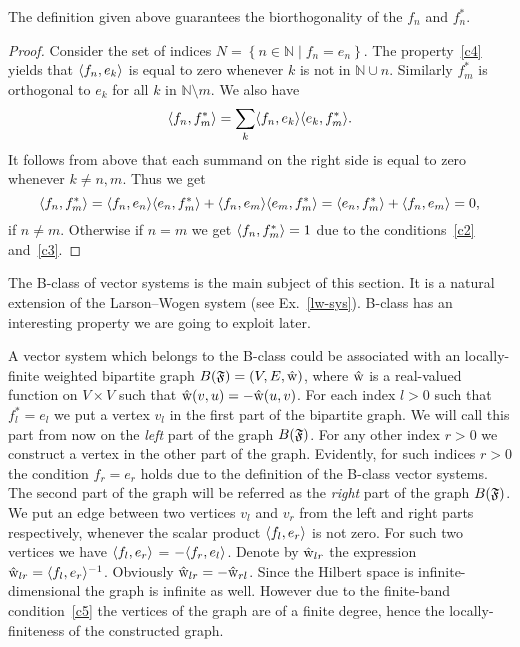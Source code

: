 \documentclass[12pt]{amsart}
\begin{document}
    \begin{prop}
      The definition given above guarantees the biorthogonality of the $f_n$ and $f^*_n$.
    \end{prop}
    \begin{proof}
      Consider the set of indices $N = \left\{n \in \mathbb{N} \mid f_n = e_n \right\}$.
      The property~\ref{c4} yields that $\langle f_n, e_k \rangle$ is equal to zero whenever $k$ is not in
        $\mathbb{N} \cup {n}$.
      Similarly $f^*_m$ is orthogonal to $e_k$ for all $k$ in $\mathbb{N} \setminus {m}$.
      We also have
      \[
        \langle f_n, f^*_m \rangle = \sum_{k} \langle f_n, e_k \rangle \langle e_k, f^*_m \rangle.
      \]
      It follows from above that each summand on the right side is equal to zero whenever $k \neq n, m$.
      Thus we get
      \[
        \langle f_n, f^*_m \rangle = \langle f_n, e_n \rangle \langle e_n, f^*_m \rangle + \langle f_n, e_m \rangle \langle e_m, f^*_m \rangle
        = \langle e_n, f^*_m \rangle + \langle f_n, e_m \rangle = 0,
      \]
      if $n \neq m$.
      Otherwise if $n = m$ we get $\langle f_n, f^*_m \rangle = 1$ due to the conditions~\ref{c2} and~\ref{c3}.
    \end{proof}
    The B-class of vector systems is the main subject of this section.
    It is a natural extension of the Larson--Wogen system (see Ex.~\ref{lw-sys}).
    B-class has an interesting property we are going to exploit later.
    \begin{remark}
      A vector system which belongs to the B-class could be associated with an
        locally-finite weighted bipartite graph $B(\mathfrak{F}) = (V, E, \mathrm{\hat{w}})$, where $\mathrm{\hat{w}}$ is a
        real-valued function on $V\times V$ such that $\mathrm{\hat{w}}(v, u) = -\mathrm{\hat{w}}(u, v)$.
      For each index $l > 0$ such that $f^*_l = e_l$ we put a vertex $v_l$ in the first part of the bipartite graph.
      We will call this part from now on the \emph{left} part of the graph $B(\mathfrak{F})$.
      For any other index $r > 0$ we construct a vertex in the other part of the graph.
      Evidently, for such indices $r > 0$ the condition $f_r = e_r$ holds due to the definition of the B-class vector systems.
      The second part of the graph will be referred as the \emph{right} part of the graph $B(\mathfrak{F})$.
      We put an edge between two vertices $v_l$ and $v_r$ from the left and right parts respectively,
        whenever the scalar product $\langle f_l, e_r \rangle$ is not zero.
      For such two vertices we have $\langle f_l, e_r \rangle$ = $-\langle f_r, e_l \rangle$.
      Denote by $\mathrm{\hat{w}}_{lr}$ the expression $\mathrm{\hat{w}}_{lr} = \langle f_l, e_r \rangle^{-1}$.
      Obviously $\mathrm{\hat{w}}_{lr} = -\mathrm{\hat{w}}_{rl}$.
      Since the Hilbert space is infinite-dimensional the graph is infinite as well.
      However due to the finite-band condition~\ref{c5} the vertices of the graph are of a finite degree, hence the locally-finiteness of
        the constructed graph.
    \end{remark}
\end{document}
